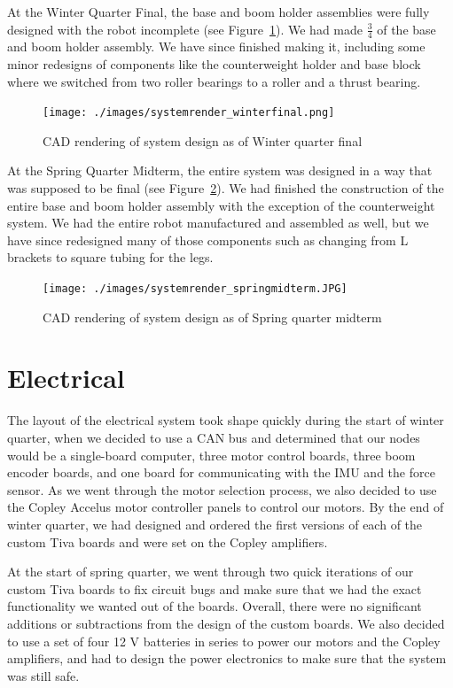 \documentclass{report}
\begin{document}
At the Winter Quarter Final, the base and boom holder assemblies were fully designed with the robot incomplete (see Figure~\ref{fig:systemrender_WF}). We had made $\frac{3}{4}$ of the base and boom holder assembly. We have since finished making it, including some minor redesigns of components like the counterweight holder and base block where we switched from two roller bearings to a roller and a thrust bearing.

\begin{figure}[H]
\centering
\texttt{[image: ./images/systemrender\_winterfinal.png]}
\caption[CAD rendering of system design as of Winter quarter final]{CAD rendering of system design as of Winter quarter final}
\label{fig:systemrender_WF}
\end{figure}

At the Spring Quarter Midterm, the entire system was designed in a way that was supposed to be final (see Figure~\ref{fig:systemrender_SM}). We had finished the construction of the entire base and boom holder assembly with the exception of the counterweight system. We had the entire robot manufactured and assembled as well, but we have since redesigned many of those components such as changing from L brackets to square tubing for the legs.

\begin{figure}[H]
\centering
\texttt{[image: ./images/systemrender\_springmidterm.JPG]}
\caption[CAD rendering of system design as of Spring quarter midterm]{CAD rendering of system design as of Spring quarter midterm}
\label{fig:systemrender_SM}
\end{figure}

\section[Electrical]{Electrical}
The layout of the electrical system took shape quickly during the start of winter quarter, when we decided to use a CAN bus and determined that our nodes would be a single-board computer, three motor control boards, three boom encoder boards, and one board for communicating with the IMU and the force sensor. As we went through the motor selection process, we also decided to use the Copley Accelus motor controller panels to control our motors. By the end of winter quarter, we had designed and ordered the first versions of each of the custom Tiva boards and were set on the Copley amplifiers.

At the start of spring quarter, we went through two quick iterations of our custom Tiva boards to fix circuit bugs and make sure that we had the exact functionality we wanted out of the boards. Overall, there were no significant additions or subtractions from the design of the custom boards. We also decided to use a set of four 12 V batteries in series to power our motors and the Copley amplifiers, and had to design the power electronics to make sure that the system was still safe.
\end{document}
